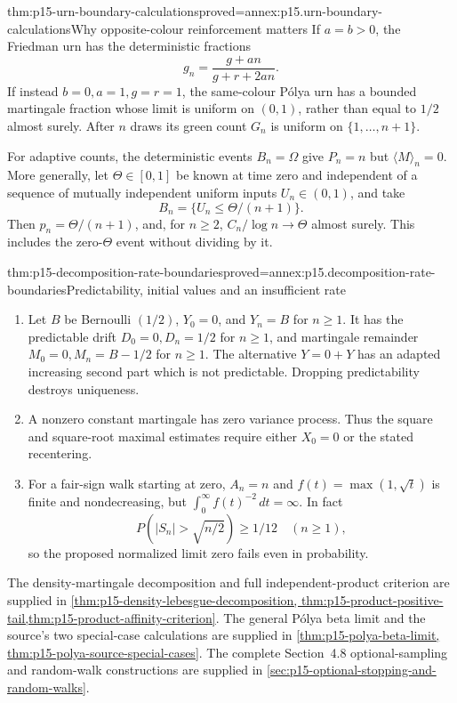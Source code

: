 \begin{hbtheorem}{thm:p15-urn-boundary-calculations}{proved=annex:p15.urn-boundary-calculations}{Why opposite-colour reinforcement matters}
If \(a=b>0\), the Friedman urn has the deterministic fractions
\[
                                g_n=\frac{g+an}{g+r+2an}.
\]
If instead \(b=0,a=1,g=r=1\), the same-colour P\'olya urn has
a bounded martingale fraction whose limit is uniform on \((0,1)\),
rather than equal to \(1/2\) almost surely.
After \(n\) draws its green count \(G_n\) is uniform on
\(\{1,\ldots,n+1\}\).

For adaptive counts, the deterministic events \(B_n=\Omega\)
give \(P_n=n\) but \(\langle M\rangle_n=0\).
More generally, let \(\Theta\in[0,1]\) be known at time zero and
independent of a sequence of mutually independent uniform inputs
\(U_n\in(0,1)\), and take
\[
                              B_n=\{U_n\leq\Theta/(n+1)\}.
\]
Then \(p_n=\Theta/(n+1)\), and, for \(n\geq2\),
\(C_n/\log n\to\Theta\) almost surely.
This includes the zero-\(\Theta\) event without dividing by it.
\end{hbtheorem}

\begin{hbtheorem}{thm:p15-decomposition-rate-boundaries}{proved=annex:p15.decomposition-rate-boundaries}{Predictability, initial values and an insufficient rate}
\begin{enumerate}
\item Let \(B\) be Bernoulli \((1/2)\), \(Y_0=0\), and \(Y_n=B\)
      for \(n\geq1\). It has the predictable drift
      \(D_0=0,D_n=1/2\) for \(n\geq1\), and martingale remainder
      \(M_0=0,M_n=B-1/2\) for \(n\geq1\).
      The alternative \(Y=0+Y\) has an adapted increasing second
      part which is not predictable. Dropping predictability
      destroys uniqueness.
\item A nonzero constant martingale has zero variance process.
      Thus the square and square-root maximal estimates require
      either \(X_0=0\) or the stated recentering.
\item For a fair-sign walk starting at zero, \(A_n=n\) and
      \(f(t)=\max(1,\sqrt t)\) is finite and nondecreasing, but
      \(\int_0^\infty f(t)^{-2}\,dt=\infty\).
      In fact
      \[
                            P(|S_n|>\sqrt{n/2})\geq1/12
                                                \quad(n\geq1),
      \]
      so the proposed normalized limit zero fails even in probability.
\end{enumerate}
\end{hbtheorem}

The density-martingale decomposition and full independent-product
criterion are supplied in \cref{thm:p15-density-lebesgue-decomposition,
thm:p15-product-positive-tail,thm:p15-product-affinity-criterion}.
The general P\'olya beta limit and the source's two special-case
calculations are supplied in \cref{thm:p15-polya-beta-limit,
thm:p15-polya-source-special-cases}.
The complete Section~4.8 optional-sampling and random-walk constructions
are supplied in \cref{sec:p15-optional-stopping-and-random-walks}.
